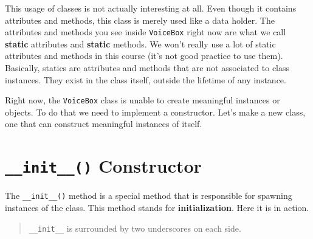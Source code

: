 This usage of classes is not actually interesting at all. Even though it
contains attributes and methods, this class is merely used like a data
holder. The attributes and methods you see inside \texttt{VoiceBox}
right now are what we call \textbf{static} attributes and
\textbf{static} methods. We won't really use a lot of static attributes
and methods in this course (it's not good practice to use them).
Basically, statics are attributes and methods that are not associated to
class instances. They exist in the class itself, outside the lifetime of
any instance.

Right now, the \texttt{VoiceBox} class is unable to create meaningful
instances or objects. To do that we need to implement a constructor.
Let's make a new class, one that can construct meaningful instances of
itself.

\section{\texorpdfstring{\texttt{\_\_init\_\_()}
Constructor}{\_\_init\_\_() Constructor}}\label{oopython.md__init__-constructor}

The \texttt{\_\_init\_\_()} method is a special method that is
responsible for spawning instances of the class. This method stands for
\textbf{initialization}. Here it is in action.

\begin{quote}
\texttt{\_\_init\_\_} is surrounded by two underscores on each side.
\end{quote}

\begin{Shaded}
\begin{Highlighting}[]
     \NormalTok{(}\NormalTok{):}
        \OperatorTok{=}

    \NormalTok{):}
        \NormalTok{(}\OperatorTok{+} 

    \NormalTok{):}
        \NormalTok{(}\OperatorTok{+}\OperatorTok{+} \OperatorTok{+} 

\OperatorTok{=}\NormalTok{)}
\OperatorTok{=}\NormalTok{)}


\OperatorTok{=} 

\end{Highlighting}
\end{Shaded}

